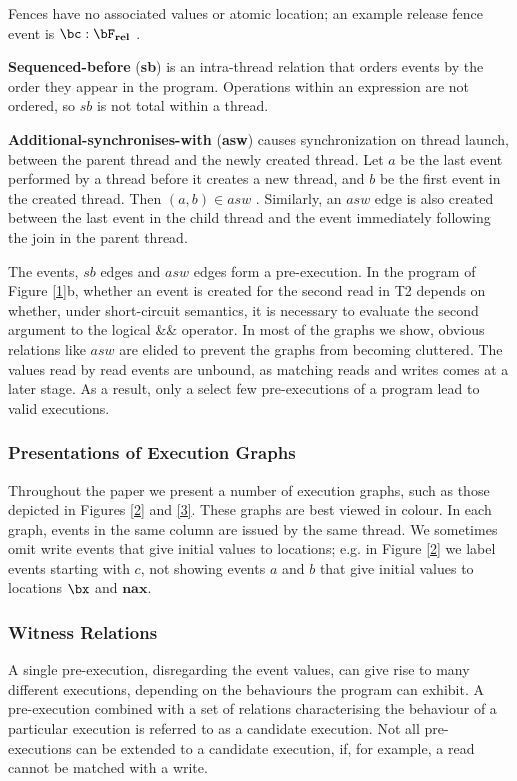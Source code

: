 \documentclass[11pt]{article}
\DeclareMathOperator{\rel}{\textbf{rel}}
\begin{document}
Fences have no associated values or atomic location; an example release fence event is \(\bc:\bF_{\rel}\) .

\textbf{Sequenced-before} (\textbf{sb}) is an intra-thread relation that orders events by the order they appear in the
program. Operations within an expression are not ordered, so \(sb\) is not total within a thread.

\textbf{Additional-synchronises-with} (\textbf{asw}) causes synchronization on thread launch, between the parent thread
and the newly created thread. Let \(a\) be the last event performed by a thread before it creates a
new thread, and \(b\) be the first event in the created thread. Then \((a,b)\in asw\) . Similarly, an
\(asw\) edge is also created between the last event in the child thread and the event immediately
following the join in the parent thread.

The events, \(sb\) edges and \(asw\) edges form a pre-execution. In the program of Figure \ref{1}b,
whether an event is created for the second read in T2 depends on whether, under short-circuit
semantics, it is necessary to evaluate the second argument to the logical \&\& operator. In most of the
graphs we show, obvious relations like \(asw\) are elided to prevent the graphs from becoming
cluttered. The values read by read events are unbound, as matching reads and writes comes at a later
stage. As a result, only a select few pre-executions of a program lead to valid executions.
\subsubsection{Presentations of Execution Graphs}
\label{sec:org8b16116}
Throughout the paper we present a number of execution graphs, such as those depicted in Figures \ref{2}
and \ref{3}. These graphs are best viewed in colour. In each graph, events in the same column are issued
by the same thread. We sometimes omit write events that give initial values to locations; e.g. in
Figure \ref{2} we label events starting with \(c\), not showing events \(a\) and \(b\) that give initial values to locations \(\bx\) and \(\textbf{nax}\).
\subsubsection{Witness Relations}
\label{sec:org33e8d9d}
A single pre-execution, disregarding the event values, can give rise to many different executions,
depending on the behaviours the program can exhibit. A pre-execution combined with a set of relations
characterising the behaviour of a particular execution is referred to as a candidate execution. Not
all pre-executions can be extended to a candidate execution, if, for example, a read cannot be matched
with a write.
\end{document}
